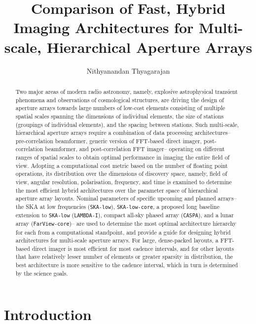 \documentclass[
  journal=pasa,
  manuscript=article-type,
  year=2020,
  volume=37,
]{cup-journal}
\title{Comparison of Fast, Hybrid Imaging Architectures for Multi-scale, Hierarchical Aperture Arrays}
\author{Nithyanandan Thyagarajan}
\affiliation{Commonwealth Scientific and Industrial Research Organisation (CSIRO), Space \& Astronomy, P. O. Box 1130, Bentley, WA 6102, Australia}
\begin{document}
\begin{abstract}
Two major areas of modern radio astronomy, namely, explosive astrophysical transient phenomena and observations of cosmological structures, are driving the design of aperture arrays towards large numbers of low-cost elements consisting of multiple spatial scales spanning the dimensions of individual elements, the size of stations (groupings of individual elements), and the spacing between stations. Such multi-scale, hierarchical aperture arrays require a combination of data processing architectures-- pre-correlation beamformer, generic version of FFT-based direct imager, post-correlation beamformer, and post-correlation FFT imager-- operating on different ranges of spatial scales to obtain optimal performance in imaging the entire field of view. Adopting a computational cost metric based on the number of floating point operations, its distribution over the dimensions of discovery space, namely, field of view, angular resolution, polarisation, frequency, and time is examined to determine the most efficient hybrid architectures over the parameter space of hierarchical aperture array layouts. Nominal parameters of specific upcoming and planned arrays-- the SKA at low frequencies (\texttt{SKA-low}), \texttt{SKA-low-core}, a proposed long baseline extension to \texttt{SKA-low} (\texttt{LAMBDA-I}), compact all-sky phased array (\texttt{CASPA}), and a lunar array (\texttt{FarView-core})-- are used to determine the most optimal architecture hierarchy for each from a computational standpoint, and provide a guide for designing hybrid architectures for multi-scale aperture arrays. For large, dense-packed layouts, a FFT-based direct imager is most efficient for most cadence intervals, and for other layouts that have relatively lesser number of elements or greater sparsity in distribution, the best architecture is more sensitive to the cadence interval, which in turn is determined by the science goals.
\end{abstract}

\section{Introduction}
\end{document}
